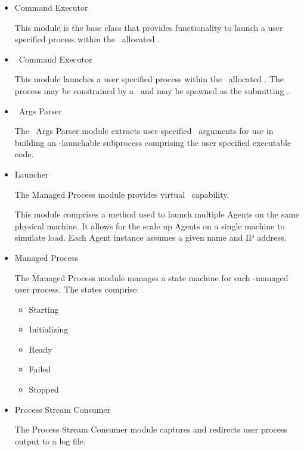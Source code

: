 \begin{itemize}
\begin{itemize}
      \item Command Executor
      
      This module is the base class that provides functionality to
      launch a user specified process within the 
      \varResourceManager~allocated \varShare. 
      
      \item \varDUCC~Command Executor
      
      This module launches a user specified process within the 
      \varResourceManager~allocated \varShare. 
      The process may be constrained by a \varLinuxControlGroup~and
      may be spawned as the submitting \varUser.
      
      \item \varJVM~Args Parser
      
      The \varJVM~Args Parser module extracts user specified \varJVM~arguments
      for use in building an \varAgent-launchable subprocess comprising
      the user specified executable code.
      
      \item Launcher
      
      The Managed Process module provides virtual \varAgent~capability.
      
      This module comprises a method used to launch multiple Agents
      on the same physical machine. 
      It allows for the scale up Agents on a single machine to simulate load.
      Each Agent instance assumes a given name and IP address.
      
      \item Managed Process

      The Managed Process module manages a state machine for each
      \varAgent-managed user process.  The states comprise:
      
         \begin{itemize}
           \item Starting
           \item Initializing
           \item Ready
           \item Failed
           \item Stopped
         \end{itemize}
         
      \item Process Stream Consumer
      
      The Process Stream Consumer module captures and redirects user process output
      to a log file.
      

\end{itemize}
\end{itemize}

